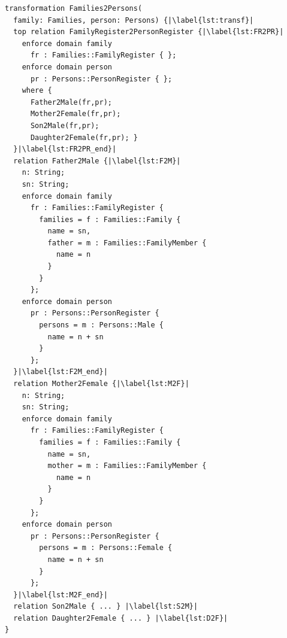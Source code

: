 \begin{lstlisting}[label={lst:jtl}, float=hbt!, language=jtl, escapechar=|, caption={The Families-to-Persons bidirectional transformation in JTL}]
transformation Families2Persons(
  family: Families, person: Persons) {|\label{lst:transf}|
  top relation FamilyRegister2PersonRegister {|\label{lst:FR2PR}|
    enforce domain family 
      fr : Families::FamilyRegister { };
    enforce domain person 
      pr : Persons::PersonRegister { };
    where {
      Father2Male(fr,pr);
      Mother2Female(fr,pr);
      Son2Male(fr,pr);
      Daughter2Female(fr,pr); }
  }|\label{lst:FR2PR_end}|	
  relation Father2Male {|\label{lst:F2M}|
    n: String;
    sn: String;
    enforce domain family 
      fr : Families::FamilyRegister {
        families = f : Families::Family {
          name = sn,
          father = m : Families::FamilyMember { 
            name = n 
          }
        }
      };
    enforce domain person 
      pr : Persons::PersonRegister {
        persons = m : Persons::Male {
          name = n + sn
        }
      };
  }|\label{lst:F2M_end}|	
  relation Mother2Female {|\label{lst:M2F}|
    n: String;
    sn: String;
    enforce domain family 
      fr : Families::FamilyRegister {
        families = f : Families::Family {
          name = sn,
          mother = m : Families::FamilyMember {
            name = n
          }
        }
      };
    enforce domain person 
      pr : Persons::PersonRegister {
        persons = m : Persons::Female {
          name = n + sn
        }
      };
  }|\label{lst:M2F_end}| 	
  relation Son2Male { ... } |\label{lst:S2M}| 
  relation Daughter2Female { ... } |\label{lst:D2F}| 
}
\end{lstlisting}


